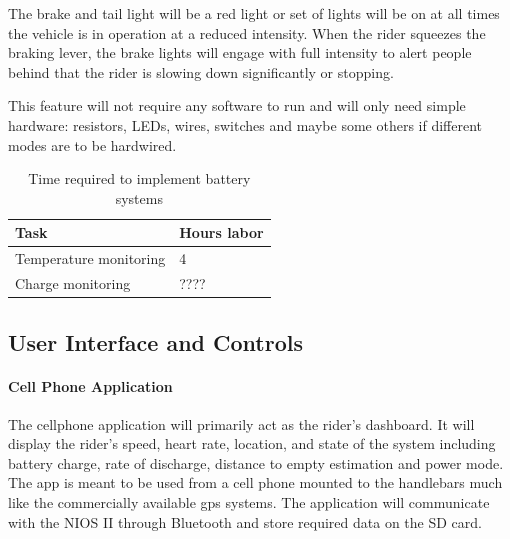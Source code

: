 \documentclass[12pt,article]{IEEEtran}
\begin{document}
        	The brake and tail light will be a red light or set of lights will be on at all times the 
        	vehicle is in operation at a reduced intensity.  When the rider squeezes the braking lever, 
        	the brake lights will engage with full intensity to alert people behind that the rider is 
        	slowing down significantly or stopping.
        	
        	This feature will not require any software to run and will only need simple hardware: resistors, 
        	LEDs, wires, switches and maybe some others if different modes are to be hardwired.  
      
        \begin{table}[H]        
            \renewcommand{\arraystretch}{1.3}
    			\caption{Time required to implement battery systems}
    			
    			\label{Estimated Time}
    			
    			\centering
    			\begin{tabular}{p{6cm}|p{1.6cm}}
    			\hline
    			\bfseries 	Task 			        	& \bfseries Hours labor		     		   \\
    			\hline\hline
    						Temperature monitoring		& 4						    	            \\
    						Charge monitoring       	& ????				                            \\	
    				        \hline	
    			\end{tabular}
		\end{table}
    
    \subsection{User Interface and Controls}
        \paragraph{Cell Phone Application}
            The cellphone application will primarily act as the rider's dashboard. It will display the 
            rider's speed, heart rate, location, and state of the system including battery charge, rate 
            of discharge, distance to empty estimation and power mode. The app is meant to be used from 
            a cell phone mounted to the handlebars much like the commercially available gps systems. The
            application will communicate with the NIOS II through Bluetooth and store required data on the 
            SD card. 
            
\end{document}
